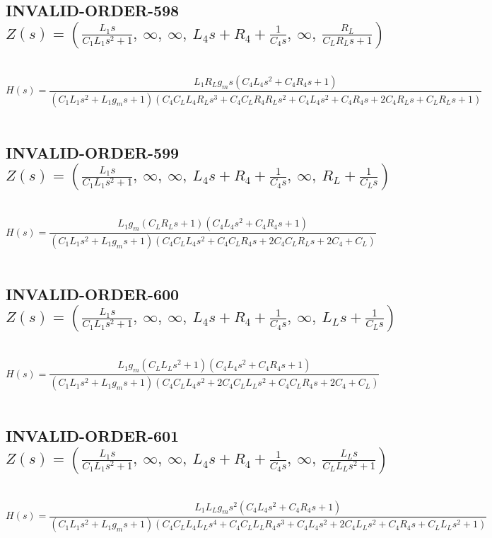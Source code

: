 \documentclass{article}
\begin{document}
\subsection{INVALID-ORDER-598 $Z(s) = \left( \frac{L_{1} s}{C_{1} L_{1} s^{2} + 1}, \  \infty, \  \infty, \  L_{4} s + R_{4} + \frac{1}{C_{4} s}, \  \infty, \  \frac{R_{L}}{C_{L} R_{L} s + 1}\right)$ } \ 
\textbf{\[H(s) = \frac{L_{1} R_{L} g_{m} s \left(C_{4} L_{4} s^{2} + C_{4} R_{4} s + 1\right)}{\left(C_{1} L_{1} s^{2} + L_{1} g_{m} s + 1\right) \left(C_{4} C_{L} L_{4} R_{L} s^{3} + C_{4} C_{L} R_{4} R_{L} s^{2} + C_{4} L_{4} s^{2} + C_{4} R_{4} s + 2 C_{4} R_{L} s + C_{L} R_{L} s + 1\right)}\] } \ 
\subsection{INVALID-ORDER-599 $Z(s) = \left( \frac{L_{1} s}{C_{1} L_{1} s^{2} + 1}, \  \infty, \  \infty, \  L_{4} s + R_{4} + \frac{1}{C_{4} s}, \  \infty, \  R_{L} + \frac{1}{C_{L} s}\right)$ } \ 
\textbf{\[H(s) = \frac{L_{1} g_{m} \left(C_{L} R_{L} s + 1\right) \left(C_{4} L_{4} s^{2} + C_{4} R_{4} s + 1\right)}{\left(C_{1} L_{1} s^{2} + L_{1} g_{m} s + 1\right) \left(C_{4} C_{L} L_{4} s^{2} + C_{4} C_{L} R_{4} s + 2 C_{4} C_{L} R_{L} s + 2 C_{4} + C_{L}\right)}\] } \ 
\subsection{INVALID-ORDER-600 $Z(s) = \left( \frac{L_{1} s}{C_{1} L_{1} s^{2} + 1}, \  \infty, \  \infty, \  L_{4} s + R_{4} + \frac{1}{C_{4} s}, \  \infty, \  L_{L} s + \frac{1}{C_{L} s}\right)$ } \ 
\textbf{\[H(s) = \frac{L_{1} g_{m} \left(C_{L} L_{L} s^{2} + 1\right) \left(C_{4} L_{4} s^{2} + C_{4} R_{4} s + 1\right)}{\left(C_{1} L_{1} s^{2} + L_{1} g_{m} s + 1\right) \left(C_{4} C_{L} L_{4} s^{2} + 2 C_{4} C_{L} L_{L} s^{2} + C_{4} C_{L} R_{4} s + 2 C_{4} + C_{L}\right)}\] } \ 
\subsection{INVALID-ORDER-601 $Z(s) = \left( \frac{L_{1} s}{C_{1} L_{1} s^{2} + 1}, \  \infty, \  \infty, \  L_{4} s + R_{4} + \frac{1}{C_{4} s}, \  \infty, \  \frac{L_{L} s}{C_{L} L_{L} s^{2} + 1}\right)$ } \ 
\textbf{\[H(s) = \frac{L_{1} L_{L} g_{m} s^{2} \left(C_{4} L_{4} s^{2} + C_{4} R_{4} s + 1\right)}{\left(C_{1} L_{1} s^{2} + L_{1} g_{m} s + 1\right) \left(C_{4} C_{L} L_{4} L_{L} s^{4} + C_{4} C_{L} L_{L} R_{4} s^{3} + C_{4} L_{4} s^{2} + 2 C_{4} L_{L} s^{2} + C_{4} R_{4} s + C_{L} L_{L} s^{2} + 1\right)}\] } \ 
\end{document}
